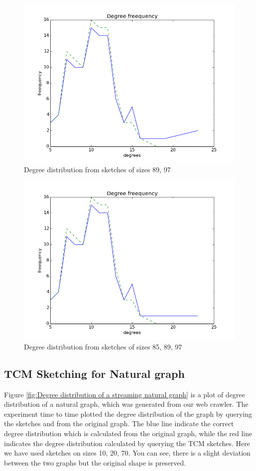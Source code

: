 \documentclass[conference]{IEEEtran}
\begin{document}
\begin{figure}[!t]
\centering
\includegraphics[width=0.8\linewidth]{dd2}
\caption{Degree distribution from sketches of sizes 89, 97}
\label{fig:Degree distribution from sketches of sizes 89, 97}
\end{figure}

\begin{figure}[!t]
\centering
\includegraphics[width=0.8\linewidth]{dd3}
\caption{Degree distribution from sketches of sizes 85, 89, 97}
\label{fig:Degree distribution from sketches of sizes 85, 89, 97}
\end{figure}

\subsection{TCM Sketching for Natural graph}
Figure \ref{fig:Degree distribution of a streaming natural graph} is a plot of degree distribution of a natural graph, which was generated from our web crawler. The experiment time to time plotted the degree distribution of the graph by querying the sketches and from the original graph. The blue line indicate the correct degree distribution which is calculated from the original graph, while the red line indicates the degree distribution calculated by querying the TCM sketches. Here we have used sketches on sizes 10, 20, 70. You can see, there is a slight deviation between the two graphs but the original shape is preserved.
\end{document}
